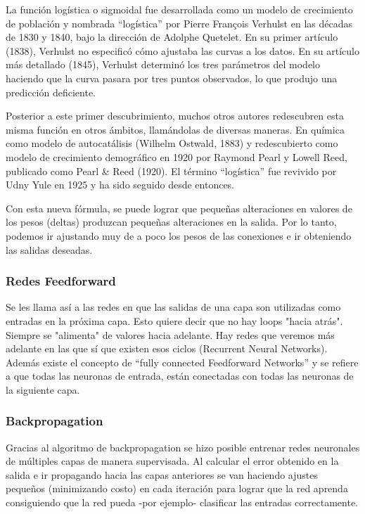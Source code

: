 \documentclass[a4paper]{article}
\begin{document}
La función logística o sigmoidal fue desarrollada como un modelo 
de crecimiento de población y nombrada ``logística'' por Pierre 
François Verhulst en las décadas de 1830 y 1840, bajo la dirección 
de Adolphe Quetelet.
En su primer artículo (1838), Verhulst no especificó cómo ajustaba 
las curvas a los datos. En su artículo más detallado (1845), 
Verhulst determinó los tres parámetros del modelo haciendo que la 
curva pasara por tres puntos observados, lo que produjo una 
predicción deficiente.

Posterior a este primer descubrimiento, muchos otros autores
redescubren esta misma función en otros ámbitos, llamándolas de
diversas maneras. En química como modelo de autocatálisis (Wilhelm 
Ostwald, 1883) y redescubierto como modelo de crecimiento
demográfico en 1920 por Raymond Pearl y Lowell Reed, publicado 
como Pearl \& Reed (1920). El término ``logística'' fue revivido 
por Udny Yule en 1925 y ha sido seguido desde entonces.


Con esta nueva fórmula, se puede lograr que pequeñas alteraciones 
en valores de los pesos (deltas) produzcan pequeñas alteraciones 
en la salida. Por lo tanto, podemos ir ajustando muy de a poco los 
pesos de las conexiones e ir obteniendo las salidas deseadas.

\subsubsection{Redes Feedforward}

Se les llama así a las redes en que las salidas de una capa son 
utilizadas como entradas en la próxima capa. Esto quiere decir que 
no hay loops "hacia atrás". Siempre se "alimenta" de valores hacia 
adelante. Hay redes que veremos más adelante en las que sí que 
existen esos ciclos (Recurrent Neural Networks). Además existe el 
concepto de ``fully connected Feedforward Networks'' y se refiere 
a que todas las neuronas de entrada, están conectadas con todas las 
neuronas de la siguiente capa.

\subsubsection{Backpropagation}

Gracias al algoritmo de backpropagation se hizo posible entrenar 
redes neuronales de múltiples capas de manera supervisada. Al 
calcular el error obtenido en la salida e ir propagando hacia las 
capas anteriores se van haciendo ajustes pequeños (minimizando 
costo) en cada iteración para lograr que la red aprenda 
consiguiendo que la red pueda -por ejemplo- clasificar las 
entradas correctamente.
\end{document}
